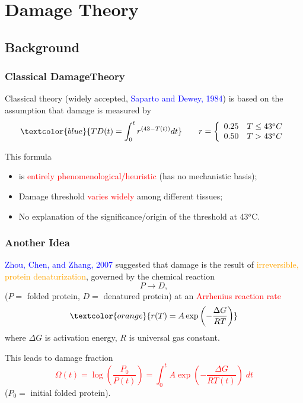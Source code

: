 \documentclass{beamer}
\begin{document}
\section{Damage Theory}
\subsection{Background}
\begin{frame}
\frametitle{Classical DamageTheory}
Classical theory (widely accepted, \textcolor{blue}{Saparto and Dewey, 1984}) is based on the assumption that damage  is measured by 
\begin{equation*}
\textcolor{blue}{TD(t) = \int_0^tr^{(43-T(t))}dt}\qquad r = \left\{\begin{array}{cc}0.25 & T\le43^oC\\0.50&T>43^oC\end{array}\right.
\end{equation*}

This formula 
\begin{itemize}
\item is \textcolor{red}{entirely phenomenological/heuristic} (has no mechanistic basis);
\item Damage threshold \textcolor{red}{varies widely} among different tissues;
\item No explanation of the significance/origin of the threshold at 43$^o$C.
\end{itemize}



\end{frame}

\begin{frame}
\frametitle{Another Idea}
\textcolor{blue}{Zhou, Chen, and  Zhang, 2007} suggested that damage is the result of \textcolor{orange}{irreversible, protein denaturization}, governed by the chemical reaction
\begin{equation*}
P\rightarrow D,
\end{equation*}
($P =$ folded protein, $D=$ denatured protein) at an \textcolor{red}{Arrhenius reaction rate}
\begin{equation*}
\textcolor{orange}{r(T) = A\exp\left(-\frac{\Delta G}{RT}\right)}
\end{equation*}
where $\Delta G$ is activation energy, $R$ is universal gas constant.

This leads to damage fraction
\textcolor{red}
{
\begin{equation*}
\Omega(t) = \log\left(\frac{P_0}{P(t)}\right) = \int_0^tA\exp\left(-\frac{\Delta G}{RT(t)}\right) \; dt
\end{equation*}
}
($P_0=$ initial folded protein).
 
\end{frame}
 
\end{document}
